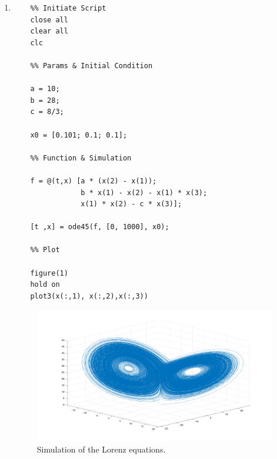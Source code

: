 \begin{solution}[3.3]
\begin{enumerate}
\item
\begin{verbatim}
	%% Initiate Script
	close all
	clear all
	clc
	
	%% Params & Initial Condition
	
	a = 10;
	b = 28;
	c = 8/3;
	
	x0 = [0.101; 0.1; 0.1];
	
	%% Function & Simulation
	
	f = @(t,x) [a * (x(2) - x(1));
	            b * x(1) - x(2) - x(1) * x(3);
	            x(1) * x(2) - c * x(3)];
	        
	[t ,x] = ode45(f, [0, 1000], x0);
	
	%% Plot
	
	figure(1)
	hold on
	plot3(x(:,1), x(:,2),x(:,3))
\end{verbatim}

\begin{figure}[h]
	\centering
	\includegraphics[scale=0.48]{figures/solutions/ch3/S03D01.pdf}
	\caption{Simulation of the Lorenz equations.}
\end{figure}
\end{enumerate}
\end{solution}

